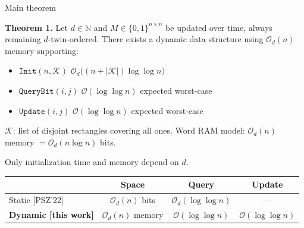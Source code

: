 \documentclass[aspectratio=169,11pt]{beamer}
\newcommand{\Oh}{\mathcal{O}}
\begin{document}
\begin{frame}{Main theorem}
\begin{block}{\textbf{Theorem 1.}}
Let $d\in\mathbb{N}$ and $M\in\{0,1\}^{n\times n}$ be updated over time, always remaining $d$-twin-ordered.
There exists a dynamic data structure using $\Oh_d(n)$ memory supporting:
\begin{itemize}
\item $\mathtt{Init}(n,\mathcal{K})$ \hfill $\Oh_d\!\bigl((n+|\mathcal{K}|)\log\log n\bigr)$
\item $\mathtt{QueryBit}(i,j)$ \hfill $\Oh(\log\log n)$ expected worst-case
\item $\mathtt{Update}(i,j)$ \hfill $\Oh(\log\log n)$ expected worst-case
\end{itemize}
\end{block}

\vspace{-0.2em}
{\small $\mathcal{K}$: list of disjoint rectangles covering all ones. \quad Word RAM model: $\Oh_d(n)$ memory $=\Oh_d(n\log n)$ bits.}

\smallskip
{\small Only initialization time and memory depend on $d$.}

\medskip
\centering
\begin{tabular}{lccc}
\toprule
& \textbf{Space} & \textbf{Query} & \textbf{Update}\\
\midrule
Static [PSZ'22] & $\Oh_d(n)$ bits & $\Oh_d(\log\log n)$ & ---\\
\textbf{Dynamic [this work]} & $\Oh_d(n)$ memory & $\Oh(\log\log n)$ & $\Oh(\log\log n)$\\
\bottomrule
\end{tabular}
\end{frame}
\end{document}
